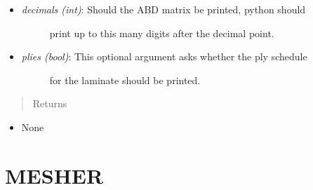 \documentclass[letterpaper,10pt,english]{sphinxmanual}
\begin{document}
\begin{fulllineitems}
\begin{fulllineitems}
\begin{itemize}
\begin{description}
\end{description}

\item {} \begin{description}
\item[{\emph{decimals (int)}: Should the ABD matrix be printed, python should}] \leavevmode
print up to this many digits after the decimal point.

\end{description}

\item {} \begin{description}
\item[{\emph{plies (bool)}: This optional argument asks whether the ply schedule}] \leavevmode
for the laminate should be printed.

\end{description}

\end{itemize}
\begin{quote}\begin{description}
\item[{Returns}] \leavevmode
\end{description}\end{quote}
\begin{itemize}
\item {} 
None

\end{itemize}

\end{fulllineitems}


\end{fulllineitems}



\section{MESHER}
\label{structures:mesher}
\end{document}
